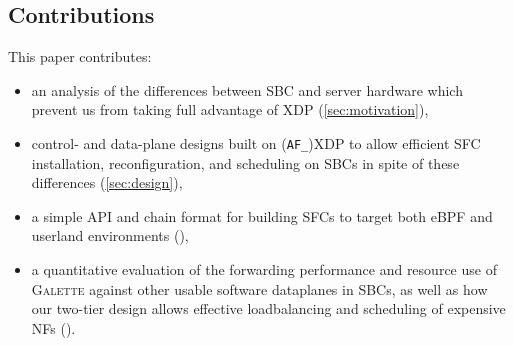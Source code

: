\documentclass[comsoc, conference, times]{IEEEtran}
\newcommand{\ourtech}{\textsc{Galette}}
\newcommand{\afxdp}{\texttt{AF\_XDP}}
\newcommand{\af}{(\texttt{AF\_})XDP}
\begin{document}
%
%
%
%
%
%
%
%
%
%


\subsection{Contributions}
This paper contributes:
\begin{itemize}
	\item an analysis of the differences between SBC and server hardware which prevent us from taking full advantage of XDP (\cref{sec:motivation}),
	\item control- and data-plane designs built on \af{} to allow efficient SFC installation, reconfiguration, and scheduling on SBCs in spite of these differences (\cref{sec:design}),
	\item a simple API and chain format for building SFCs to target both eBPF and userland environments (),
	\item a quantitative evaluation of the forwarding performance and resource use of \ourtech{} against other usable software dataplanes in SBCs, as well as how our two-tier design allows effective loadbalancing and scheduling of expensive NFs ().
\end{itemize}
\end{document}
